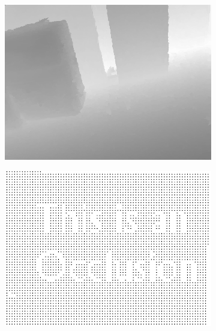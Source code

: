 \documentclass[preprint,10pt,5p,times,twocolumn]{elsarticle}
\begin{document}
\begin{figure}[t]
\begin{center}
\begin{subfigure}[b]{0.136\linewidth}
    \includegraphics[width=\linewidth]{case_random_missing_inpainting.png}
    \caption{}
    \label{fig:random_missing_inpainting}
\end{subfigure}
\begin{subfigure}[b]{0.136\linewidth}
    \includegraphics[width=\linewidth]{case_upsampling_depth.png}
    \caption{}
    \label{fig:upsampling_depth}
\end{subfigure}
\begin{subfigure}[b]{0.136\linewidth}

\end{subfigure}
\end{center}
\end{figure}
\end{document}
